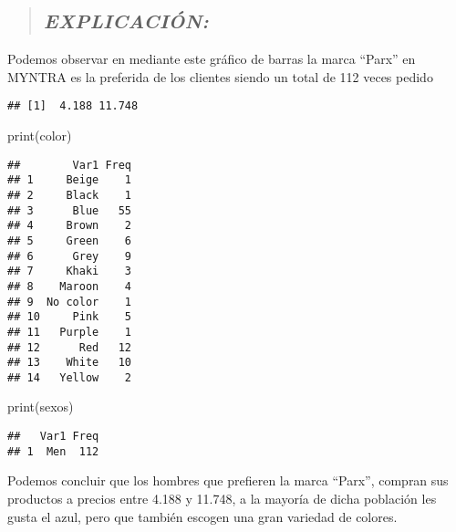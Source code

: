 \documentclass[
]{article}
\newenvironment{Shaded}{\begin{snugshade}}{\end{snugshade}}
\newcommand{\FunctionTok}[1]{\textcolor[rgb]{0.00,0.00,0.00}{#1}}
\newcommand{\NormalTok}[1]{#1}
\newcommand{\SpecialCharTok}[1]{\textcolor[rgb]{0.00,0.00,0.00}{#1}}
\begin{document}
\begin{quote}
\hypertarget{explicaciuxf3n-1}{%
\subsection{\texorpdfstring{\textbf{\emph{EXPLICACIÓN:}}}{EXPLICACIÓN:}}\label{explicaciuxf3n-1}}
\end{quote}

Podemos observar en mediante este gráfico de barras la marca ``Parx'' en
MYNTRA es la preferida de los clientes siendo un total de 112 veces
pedido

\begin{Shaded}
\end{Shaded}

\begin{verbatim}
## [1]  4.188 11.748
\end{verbatim}

\begin{Shaded}
\begin{Highlighting}[]
\FunctionTok{print}\NormalTok{(color)}
\end{Highlighting}
\end{Shaded}

\begin{verbatim}
##        Var1 Freq
## 1     Beige    1
## 2     Black    1
## 3      Blue   55
## 4     Brown    2
## 5     Green    6
## 6      Grey    9
## 7     Khaki    3
## 8    Maroon    4
## 9  No color    1
## 10     Pink    5
## 11   Purple    1
## 12      Red   12
## 13    White   10
## 14   Yellow    2
\end{verbatim}

\begin{Shaded}
\begin{Highlighting}[]
\FunctionTok{print}\NormalTok{(sexos)}
\end{Highlighting}
\end{Shaded}

\begin{verbatim}
##   Var1 Freq
## 1  Men  112
\end{verbatim}

Podemos concluir que los hombres que prefieren la marca ``Parx'',
compran sus productos a precios entre 4.188 y 11.748, a la mayoría de
dicha población les gusta el azul, pero que también escogen una gran
variedad de colores.
\end{document}
